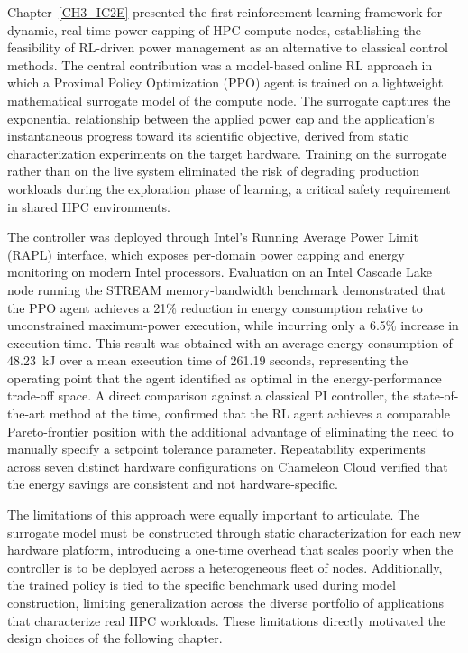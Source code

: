Chapter~\ref{CH3_IC2E} presented the first reinforcement learning framework for
dynamic, real-time power capping of HPC compute nodes, establishing the feasibility
of RL-driven power management as an alternative to classical control methods.
The central contribution was a model-based online RL approach in which a Proximal
Policy Optimization (PPO) agent is trained on a lightweight mathematical surrogate
model of the compute node.
The surrogate captures the exponential relationship between the applied power cap and
the application's instantaneous progress toward its scientific objective, derived from
static characterization experiments on the target hardware.
Training on the surrogate rather than on the live system eliminated the risk of
degrading production workloads during the exploration phase of learning, a critical
safety requirement in shared HPC environments.

The controller was deployed through Intel's Running Average Power Limit (RAPL)
interface, which exposes per-domain power capping and energy monitoring on modern
Intel processors.
Evaluation on an Intel Cascade Lake node running the STREAM memory-bandwidth benchmark
demonstrated that the PPO agent achieves a 21\% reduction in energy consumption
relative to unconstrained maximum-power execution, while incurring only a 6.5\%
increase in execution time.
This result was obtained with an average energy consumption of 48.23~kJ over a mean
execution time of 261.19 seconds, representing the operating point that the agent
identified as optimal in the energy-performance trade-off space.
A direct comparison against a classical PI controller, the state-of-the-art method at
the time, confirmed that the RL agent achieves a comparable Pareto-frontier position
with the additional advantage of eliminating the need to manually specify a setpoint
tolerance parameter.
Repeatability experiments across seven distinct hardware configurations on Chameleon
Cloud verified that the energy savings are consistent and not hardware-specific.

The limitations of this approach were equally important to articulate.
The surrogate model must be constructed through static characterization for each new
hardware platform, introducing a one-time overhead that scales poorly when the
controller is to be deployed across a heterogeneous fleet of nodes.
Additionally, the trained policy is tied to the specific benchmark used during model
construction, limiting generalization across the diverse portfolio of applications
that characterize real HPC workloads.
These limitations directly motivated the design choices of the following chapter.

